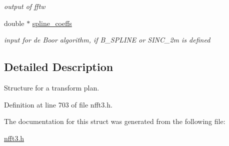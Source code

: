 \begin{CompactItemize}
\begin{CompactList}\small\item\em output of fftw \item\end{CompactList}\item 
\hypertarget{structnfst__plan_o26}{
double $\ast$ \hyperlink{structnfst__plan_o26}{spline\_\-coeffs}}
\label{structnfst__plan_o26}

\begin{CompactList}\small\item\em input for de Boor algorithm, if B\_\-SPLINE or SINC\_\-2m is defined \item\end{CompactList}\end{CompactItemize}


\subsection{Detailed Description}
Structure for a transform plan. 



Definition at line 703 of file nfft3.h.

The documentation for this struct was generated from the following file:\begin{CompactItemize}
\item 
\hyperlink{nfft3_8h}{nfft3.h}\end{CompactItemize}
